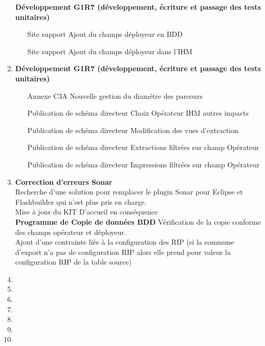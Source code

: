 \begin{enumerate}[label= Semaine \no\textbf{\arabic*.},itemsep=20pt]
\begin{enumerate}[label = Correction \no\arabic*.,align=left]
\end{enumerate}
\textbf{Développement G1R7 (développement, écriture et passage des tests unitaires)}
\begin{enumerate}[label = Développement \no\arabic*.,align=left]
	\item [Site support] Ajout du champs déployeur en BDD
	\item [Site support] Ajout du champs déployeur dans l'IHM
\end{enumerate}
\item
\textbf{Développement G1R7 (développement, écriture et passage des tests unitaires)}
\begin{enumerate}[label = Développement \no\arabic*.,align=left]
	\item [Annexe C3A] Nouvelle gestion du diamétre des parcours
	\item [Publication de schéma directeur] Choix Opérateur IHM autres impacts
	\item [Publication de schéma directeur] Modification des vues d'extraction
	\item [Publication de schéma directeur] Extractions filtrées sur champ Opérateur
	\item [Publication de schéma directeur] Impressions filtrées sur champ Opérateur
\end{enumerate}

\item
\textbf{Correction d'erreurs Sonar}
\\Recherche d'une solution pour remplacer le plugin Sonar pour Eclipse et Flashbuilder qui n'est plus pris en charge.
\\Mise à jour du KIT D'accueil en conséquence
\\\textbf{Programme de Copie de données BDD} Vérification de la copie conforme des champs opérateur et déployeur.
\\ Ajout d'une contrainte liée à la configuration des RIP (si la commune d'export n'a pas
de configuration RIP alors elle prend pour valeur la configuration RIP de la table source)
\item
\item
\item
\item
\item
\item
\item
\end{enumerate}
